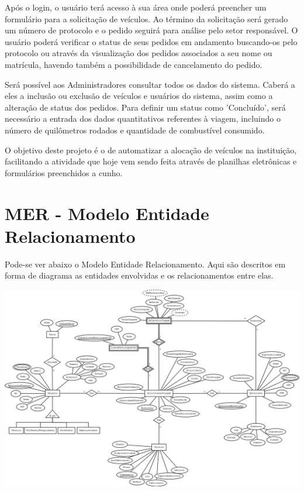 \documentclass[11pt]{article}
\begin{document}
Após o login, o usuário terá acesso à sua área onde poderá preencher um formulário para a solicitação de veículos. Ao término da solicitação será gerado um número de protocolo e o pedido seguirá para análise pelo setor responsável. O usuário poderá verificar o status de seus pedidos em andamento buscando-os pelo protocolo ou através da visualização dos pedidos associados a seu nome ou matrícula, havendo também a possibilidade de cancelamento do pedido.

Será possível aos Administradores consultar todos os dados do sistema. Caberá a eles a inclusão ou exclusão de veículos e usuários do sistema, assim como a alteração de status dos pedidos. Para definir um status como 'Concluído', será necessário a entrada dos dados quantitativos referentes à viagem, incluindo o número de quilômetros rodados e quantidade de combustível consumido.

O objetivo deste projeto é o de automatizar a alocação de veículos na instituição, facilitando a atividade que hoje vem sendo feita através de planilhas eletrônicas e formulários preenchidos a cunho.

\section{MER - Modelo Entidade Relacionamento}
Pode-se ver abaixo o Modelo Entidade Relacionamento. Aqui são descritos em forma de diagrama as entidades envolvidas e os relacionamentos entre elas.
\begin{center}
\includegraphics[scale=0.25]{esquema.png}
\end{center}   
\end{document}
